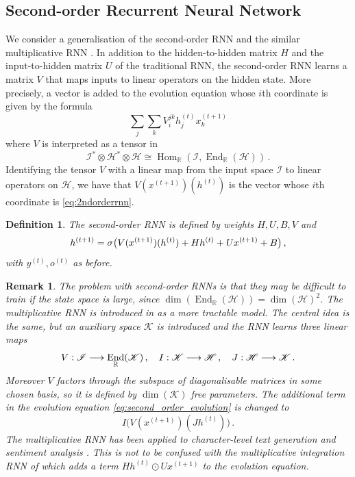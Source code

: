 \documentclass[english,letter paper,12pt,leqno]{article}
\theoremstyle{example}
\newtheorem{definition}[theorem]{Definition}
\newtheorem{remark}[theorem]{Remark}
\numberwithin{equation}{section}
\def\Hom{\operatorname{Hom}}
\def\be{\begin{equation}}
\def\ee{\end{equation}}
\DeclareMathOperator{\End}{End}
\begin{document}
\subsection{Second-order Recurrent Neural Network}

We consider a generalisation of the second-order RNN \cite{highorderrec,pollack,firstvsecond,secondorder} and the similar multiplicative RNN \cite{sutskever}. In addition to the hidden-to-hidden matrix $H$ and the input-to-hidden matrix $U$ of the traditional RNN, the second-order RNN learns a matrix $V$ that maps inputs to linear operators on the hidden state. More precisely, a vector is added to the evolution equation whose $i$th coordinate is given by the formula
\be\label{eq:2ndorderrnn}
\sum_j \sum_k V^{jk}_{i} h^{(t)}_j x^{(t+1)}_k
\ee
where $V$ is interpreted as a tensor in
\be\label{eq:input_to_operator}
\mathscr{I}^* \otimes \mathscr{H}^* \otimes \mathscr{H} \cong \Hom_{\mathbb{R}}(\mathscr{I} , \End_{\mathbb{R}}(\mathscr{H}))\,.
\ee
Identifying the tensor $V$ with a linear map from the input space $\mathscr{I}$ to linear operators on $\mathscr{H}$, we have that $V(x^{(t+1)})(h^{(t)})$ is the vector whose $i$th coordinate is \eqref{eq:2ndorderrnn}. 

\begin{definition} The second-order RNN \cite{highorderrec,pollack} is defined by weights $H,U,B,V$ and
\be\label{eq:second_order_evolution}
h^{(t+1)} = \relu\big( V( x^{(t+1)} )(h^{(t)}) + H h^{(t)} + U x^{(t+1)} + B\big)\,,
\ee 
with $y^{(t)}, o^{(t)}$ as before.
\end{definition}

\begin{remark} The problem with second-order RNNs is that they may be difficult to train if the state space is large, since $\dim(\End_{\mathbb{R}}(\mathscr{H})) = \dim(\mathscr{H})^2$. The \emph{multiplicative RNN} is introduced in \cite{sutskever} as a more tractable model. The central idea is the same, but an auxiliary space $\mathscr{K}$ is introduced and the RNN learns three linear maps
\be\label{eq:threelinearmaps}
V: \mathscr{I} \lto \End_{\mathbb{R}}(\mathscr{K})\,, \quad I: \mathscr{K} \lto \mathscr{H}\,, \quad J: \mathscr{H} \lto \mathscr{K}\,.
\ee
Moreover $V$ factors through the subspace of diagonalisable matrices in some chosen basis, so it is defined by $\dim(\mathscr{K})$ free parameters. The additional term in the evolution equation \eqref{eq:second_order_evolution} is changed to
\be\label{eq:new_term_mRNN}
I\big( V(x^{(t+1)})( J h^{(t)} ) \big)\,.
\ee
The multiplicative RNN has been applied to character-level text generation \cite{sutskever} and sentiment analysis \cite{irsoy}. This is not to be confused with the \emph{multiplicative integration} RNN of \cite{yuhai} which adds a term $H h^{(t)} \odot U x^{(t+1)}$ to the evolution equation.
\end{remark}
\end{document}
